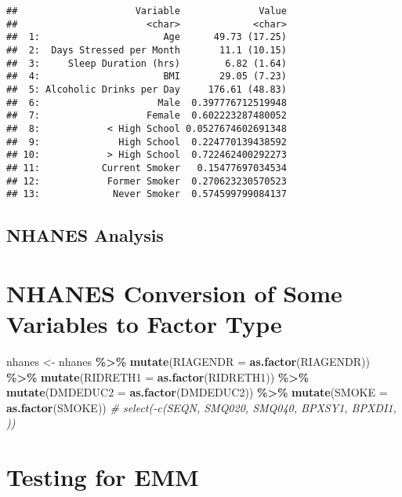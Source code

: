 \documentclass[
]{article}
\newenvironment{Shaded}{\begin{snugshade}}{\end{snugshade}}
\newcommand{\AttributeTok}[1]{\textcolor[rgb]{0.13,0.29,0.53}{#1}}
\newcommand{\CommentTok}[1]{\textcolor[rgb]{0.56,0.35,0.01}{\textit{#1}}}
\newcommand{\FunctionTok}[1]{\textcolor[rgb]{0.13,0.29,0.53}{\textbf{#1}}}
\newcommand{\NormalTok}[1]{#1}
\newcommand{\OtherTok}[1]{\textcolor[rgb]{0.56,0.35,0.01}{#1}}
\newcommand{\SpecialCharTok}[1]{\textcolor[rgb]{0.81,0.36,0.00}{\textbf{#1}}}
\begin{document}
\begin{verbatim}
##                     Variable              Value
##                       <char>             <char>
##  1:                      Age      49.73 (17.25)
##  2:  Days Stressed per Month       11.1 (10.15)
##  3:     Sleep Duration (hrs)        6.82 (1.64)
##  4:                      BMI       29.05 (7.23)
##  5: Alcoholic Drinks per Day     176.61 (48.83)
##  6:                     Male  0.397776712519948
##  7:                   Female  0.602223287480052
##  8:            < High School 0.0527674602691348
##  9:              High School  0.224770139438592
## 10:            > High School  0.722462400292273
## 11:           Current Smoker   0.15477697034534
## 12:            Former Smoker  0.270623230570523
## 13:             Never Smoker  0.574599799084137
\end{verbatim}

\subsection{NHANES Analysis}\label{nhanes-analysis}

\section{NHANES Conversion of Some Variables to Factor
Type}\label{nhanes-conversion-of-some-variables-to-factor-type}

\begin{Shaded}
\begin{Highlighting}[]
\NormalTok{nhanes }\OtherTok{\textless{}{-}}\NormalTok{ nhanes }\SpecialCharTok{\%\textgreater{}\%} 
  \FunctionTok{mutate}\NormalTok{(}\AttributeTok{RIAGENDR =} \FunctionTok{as.factor}\NormalTok{(RIAGENDR)) }\SpecialCharTok{\%\textgreater{}\%} 
  \FunctionTok{mutate}\NormalTok{(}\AttributeTok{RIDRETH1 =} \FunctionTok{as.factor}\NormalTok{(RIDRETH1)) }\SpecialCharTok{\%\textgreater{}\%} 
  \FunctionTok{mutate}\NormalTok{(}\AttributeTok{DMDEDUC2 =} \FunctionTok{as.factor}\NormalTok{(DMDEDUC2)) }\SpecialCharTok{\%\textgreater{}\%} 
  \FunctionTok{mutate}\NormalTok{(}\AttributeTok{SMOKE =} \FunctionTok{as.factor}\NormalTok{(SMOKE))}
  \CommentTok{\# select({-}c(SEQN, SMQ020, SMQ040, BPXSY1, BPXDI1, ))}
\end{Highlighting}
\end{Shaded}

\section{Testing for EMM}\label{testing-for-emm}
\end{document}

